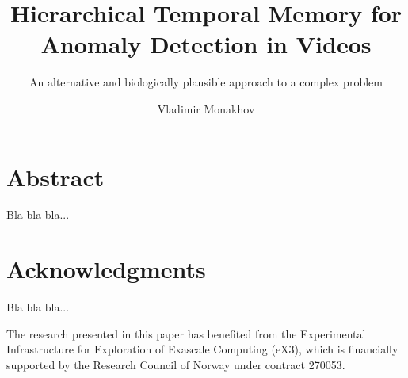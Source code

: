 \documentclass[USenglish]{ifimaster}  %
\title{Hierarchical Temporal Memory for Anomaly Detection in Videos}
\subtitle{An alternative and biologically plausible approach to a complex problem }         %
\author{Vladimir Monakhov}                      %
\begin{document}
\duoforside[
  dept={Department of Informatics},   %
  program={Informatics: Robotics and Intelligent Systems},         %
  long
]                                        %

\frontmatter{}
\mainmatter{}

\chapter*{Abstract} 
Bla bla bla...
\chapter*{Acknowledgments} 
Bla bla bla...
\par
The research presented in this paper has benefited from the Experimental Infrastructure for Exploration of Exascale Computing (eX3), which is financially supported by the Research Council of Norway under contract 270053.

\tableofcontents
\mainmatter






\backmatter{}
\printbibliography
\end{document}
